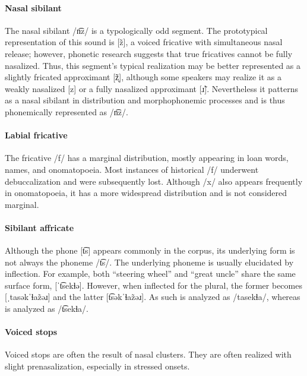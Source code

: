\paragraph{Nasal sibilant}
The nasal sibilant /n͡z/ is a typologically odd segment. The prototypical representation of this sound is [z̃], a voiced fricative with simultaneous nasal release; however, phonetic research suggests that true fricatives cannot be fully nasalized. Thus, this segment's typical realization may be better represented as a slightly fricated approximant [z̞̃], although some speakers may realize it as a weakly nasalized [z] or a fully nasalized approximant [ɹ̃]. Nevertheless it patterns as a nasal sibilant in distribution and morphophonemic processes and is thus phonemically represented as /n͡z/.

\paragraph{Labial fricative}
The fricative /f/ has a marginal distribution, mostly appearing in loan words, names, and onomatopoeia. Most instances of historical /f/ underwent debuccalization and were subsequently lost. Although /x/ also appears frequently in onomatopoeia, it has a more widespread distribution and is not considered marginal.

\paragraph{Sibilant affricate}
Although the phone [t͡s] appears commonly in the corpus, its underlying form is not always the phoneme /t͡s/.  The underlying phoneme is usually elucidated by inflection. For example, both  “steering wheel” and  “great uncle” share the same surface form, [ˈt͡sekɬə]. However, when inflected for the plural, the former becomes [ˌtasəkˈɬaz̃əɹ] and the latter [t͡səkˈɬaz̃əɹ]. As such  is analyzed as /tasekɬa/, whereas  is analyzed as /t͡sekɬa/. 

\paragraph{Voiced stops}
Voiced stops are often the result of nasal clusters.  They are often realized with slight prenasalization, especially in stressed onsets.

